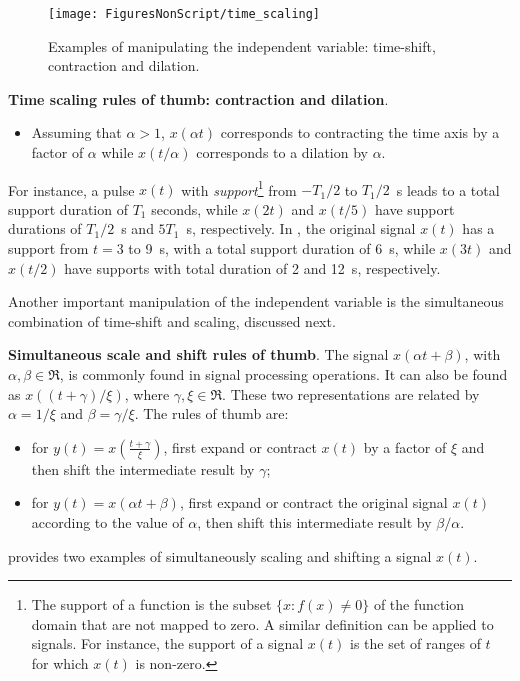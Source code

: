 \begin{figure}
	\centering
		\texttt{[image: FiguresNonScript/time\_scaling]}
	\caption{Examples of manipulating the independent variable: time-shift, contraction and dilation.\label{fig:time_scaling}}
\end{figure}

\bExample \textbf{Time scaling rules of thumb: contraction and dilation}.
\begin{itemize}
	\item Assuming that $\alpha > 1$, $x(\alpha t)$ corresponds to contracting the time axis by a factor
	of $\alpha$ while $x(t / \alpha)$ corresponds to a dilation by $\alpha$.
\end{itemize}
For instance, a pulse $x(t)$ with \emph{support}\footnote{The support of a function is the subset $\{x : f(x) \ne 0\}$ of the function domain that are not mapped to zero. A similar definition can be applied to signals. For instance, the support of a signal $x(t)$ is the set of ranges of $t$ for which $x(t)$ is non-zero.} from $-T_1/2$ to $T_1/2$~s leads to a total support duration of $T_1$ seconds, while $x(2t)$ and $x(t/5)$ have support durations of $T_1/2$~s and $5 T_1$~s, respectively.
In , the original signal $x(t)$ has a support from $t=3$ to 9~s, with a total support duration of 6~s, while $x(3t)$ and $x(t/2)$ have supports with total duration of 2 and 12~s, respectively.
\eExample


Another important manipulation of the independent variable is the simultaneous combination of time-shift and scaling, 
discussed next.%

\bExample \textbf{Simultaneous scale and shift rules of thumb}.
\label{ex:simulScaleShift}
The signal $x(\alpha t + \beta)$, with $\alpha, \beta \in \Re$, is commonly found in
signal processing operations. It can also be found as $x( (t + \gamma) / \xi)$, where $\gamma, \xi \in \Re$. These two representations are related by $\alpha = 1/\xi$ and $\beta=\gamma/ \xi$. %
The rules of thumb are:
\begin{itemize}
\item for $y(t) = x \left(\frac{t + \gamma}{\xi}\right)$, first expand or contract $x(t)$ by a factor of $\xi$ and then shift the intermediate result by $\gamma$;
\item for $y(t)=x(\alpha t + \beta)$, first expand or contract the original signal $x(t)$ according
to the value of $\alpha$, then shift this intermediate result by $\beta/\alpha$.
\end{itemize}
 provides two examples of simultaneously scaling and shifting a signal $x(t)$. 
\eExample 

